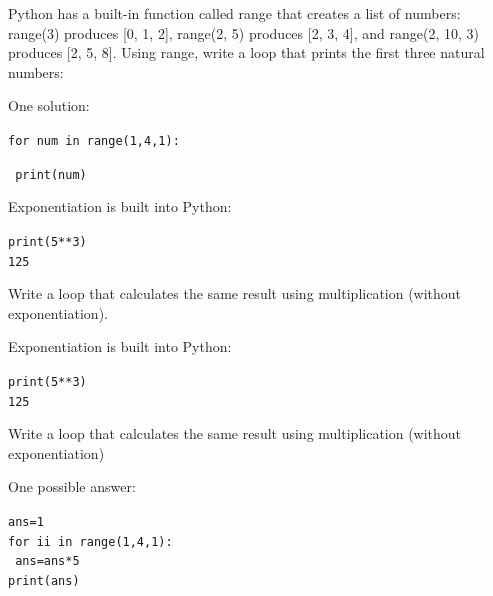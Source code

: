 \documentclass{beamer}
\begin{document}

\begin{frame}{ }

Python has a built-in function called range that creates a list of numbers: range(3) produces [0, 1, 2], range(2, 5) produces [2, 3, 4], and range(2, 10, 3) produces [2, 5, 8]. Using range, write a loop that prints the first three natural numbers:

\vspace{0.5cm}

\alert{One solution:}

\texttt{for num in range(1,4,1):}

\texttt{      print(num)}
    

\end{frame}



\begin{frame}{ }

Exponentiation is built into Python:

\vspace{0.5cm}

\begin{beamerboxesrounded}[upper=uppercolgreen,lower=lowercolgreen,shadow=false]{}

\texttt{print(5**3)\\
125}
\end{beamerboxesrounded}

\vspace{0.5cm}

Write a loop that calculates the same result using multiplication (without exponentiation).
\end{frame}


\begin{frame}{ }

Exponentiation is built into Python:

\vspace{0.5cm}

\begin{beamerboxesrounded}[upper=uppercolgreen,lower=lowercolgreen,shadow=false]{}

\texttt{print(5**3)\\
125}
\end{beamerboxesrounded}

\vspace{0.5cm}

Write a loop that calculates the same result using multiplication (without exponentiation)

\alert{One possible answer:}

\texttt{ans=1}\\
\texttt{for ii in range(1,4,1):}\\
\texttt{      ans=ans*5}\\
\texttt{print(ans)}

\end{frame}

\end{document}
